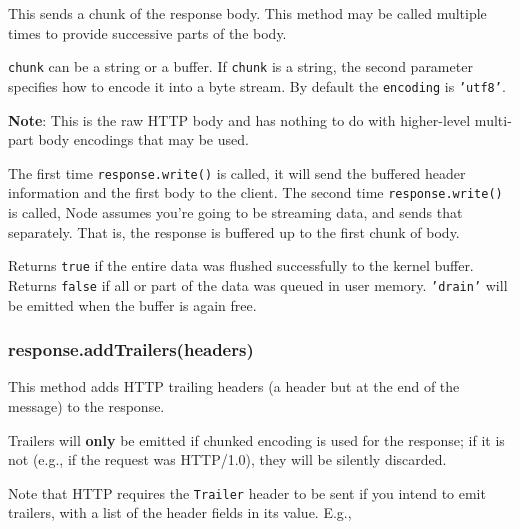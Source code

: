 This sends a chunk of the response body. This method may be called
multiple times to provide successive parts of the body.

\texttt{chunk} can be a string or a buffer. If \texttt{chunk} is a
string, the second parameter specifies how to encode it into a byte
stream. By default the \texttt{encoding} is \texttt{'utf8'}.

\textbf{Note}: This is the raw HTTP body and has nothing to do with
higher-level multi-part body encodings that may be used.

The first time \texttt{response.write()} is called, it will send the
buffered header information and the first body to the client. The second
time \texttt{response.write()} is called, Node assumes you're going to
be streaming data, and sends that separately. That is, the response is
buffered up to the first chunk of body.

Returns \texttt{true} if the entire data was flushed successfully to the
kernel buffer. Returns \texttt{false} if all or part of the data was
queued in user memory. \texttt{'drain'} will be emitted when the buffer
is again free.

\subsubsection{response.addTrailers(headers)}

This method adds HTTP trailing headers (a header but at the end of the
message) to the response.

Trailers will \textbf{only} be emitted if chunked encoding is used for
the response; if it is not (e.g., if the request was HTTP/1.0), they
will be silently discarded.

Note that HTTP requires the \texttt{Trailer} header to be sent if you
intend to emit trailers, with a list of the header fields in its value.
E.g.,

\begin{Shaded}
\begin{Highlighting}[]
\NormalTok{(}\NormalTok{, \{ }\NormalTok{: }\NormalTok{,}
                          \NormalTok{: } \NormalTok{\});}
\NormalTok{(\{}\NormalTok{: }\NormalTok{\});}
\NormalTok{();}
\end{Highlighting}
\end{Shaded}


